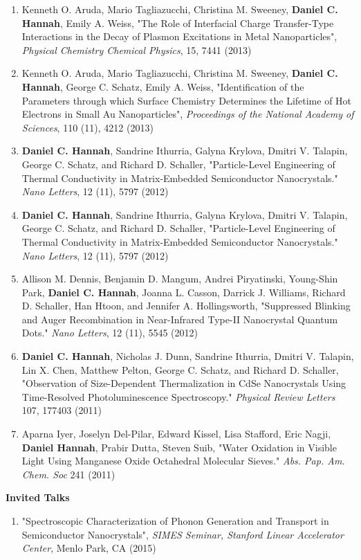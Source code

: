 \documentclass[12pt]{nuthesis}	%
\begin{document}
\begin{vita}
\begin{enumerate}
\item Kenneth O. Aruda, Mario Tagliazucchi, Christina M. Sweeney, \textbf{Daniel C. Hannah}, Emily A. Weiss, "The Role of Interfacial Charge Transfer-Type Interactions in the Decay of Plasmon Excitations in Metal Nanoparticles", \emph{Physical Chemistry Chemical Physics}, 15, 7441 (2013) 
\item Kenneth O. Aruda, Mario Tagliazucchi, Christina M. Sweeney, \textbf{Daniel C. Hannah}, George C. Schatz, Emily A. Weiss, "Identification of the Parameters through which Surface Chemistry Determines the Lifetime of Hot Electrons in Small Au Nanoparticles", \emph{Proceedings of the National Academy of Sciences}, 110 (11), 4212 (2013) 
\item \textbf{Daniel C. Hannah}, Sandrine Ithurria, Galyna Krylova, Dmitri V. Talapin, George C. Schatz, and Richard D. Schaller, "Particle-Level Engineering of Thermal Conductivity in Matrix-Embedded Semiconductor Nanocrystals." \emph{Nano Letters}, 12 (11), 5797 (2012) 
\item \textbf{Daniel C. Hannah}, Sandrine Ithurria, Galyna Krylova, Dmitri V. Talapin, George C. Schatz, and Richard D. Schaller, "Particle-Level Engineering of Thermal Conductivity in Matrix-Embedded Semiconductor Nanocrystals." \emph{Nano Letters}, 12 (11), 5797 (2012) 
\item Allison M. Dennis, Benjamin D. Mangum, Andrei Piryatinski, Young-Shin Park, \textbf{Daniel C. Hannah}, Joanna L. Casson, Darrick J. Williams, Richard D. Schaller, Han Htoon, and Jennifer A. Hollingsworth, "Suppressed Blinking and Auger Recombination in Near-Infrared Type-II Nanocrystal Quantum Dots." \emph{Nano Letters}, 12 (11), 5545 (2012) 
\item \textbf{Daniel C. Hannah}, Nicholas J. Dunn, Sandrine Ithurria, Dmitri V. Talapin, Lin X. Chen, Matthew Pelton, George C. Schatz, and Richard D. Schaller, "Observation of Size-Dependent Thermalization in CdSe Nanocrystals Using Time-Resolved Photoluminescence Spectroscopy." \emph{Physical Review Letters} 107, 177403 (2011) 
\item Aparna Iyer, Joselyn Del-Pilar, Edward Kissel, Lisa Stafford, Eric Nagji, {\bf Daniel Hannah}, Prabir Dutta, Steven Suib, "Water Oxidation in Visible Light Using Manganese Oxide Octahedral Molecular Sieves." \emph{Abs. Pap. Am. Chem. Soc} 241 (2011) 
\end{enumerate}

\textbf{Invited Talks}
\begin{enumerate}
\item "Spectroscopic Characterization of Phonon Generation and Transport in Semiconductor Nanocrystals", \emph{SIMES Seminar, Stanford Linear Accelerator Center}, Menlo Park, CA (2015)


\end{enumerate}
\end{vita}
\end{document}
